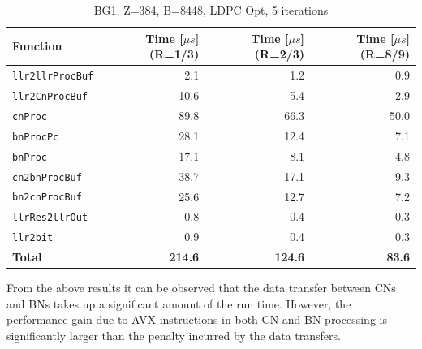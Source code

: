 \documentclass{article}
\begin{document}
\begin{table}[ht]
  \centering
  \begin{tabular}{lrrr}
    \toprule
    \textbf{Function} &  \textbf{Time [$\mu s$] (R=1/3)} & \textbf{Time [$\mu s$] (R=2/3)} & \textbf{Time [$\mu s$] (R=8/9)}\\
    \midrule
    \texttt{llr2llrProcBuf}  & 2.1  & 1.2  & 0.9  \\
    \texttt{llr2CnProcBuf}   & 10.6 & 5.4  & 2.9  \\
    \texttt{cnProc}          & 89.8 & 66.3 & 50.0 \\
    \texttt{bnProcPc}        & 28.1 & 12.4 & 7.1 \\
    \texttt{bnProc}          & 17.1 & 8.1  & 4.8 \\
    \texttt{cn2bnProcBuf}    & 38.7 & 17.1 & 9.3 \\
    \texttt{bn2cnProcBuf}    & 25.6 & 12.7 & 7.2 \\
    \texttt{llrRes2llrOut}   & 0.8  & 0.4  & 0.3 \\
    \texttt{llr2bit}         & 0.9  & 0.4  & 0.3 \\
    \midrule
    \textbf{Total}           & \textbf{214.6} & \textbf{124.6} & \textbf{83.6}\\
    \bottomrule
  \end{tabular}
  \caption{BG1, Z=384, B=8448, LDPC Opt, 5 iterations}
  \label{tab:lat-bg1-i5}
\end{table}

From the above results it can be observed that the data transfer between CNs and BNs takes up a significant amount of the run time. However, the performance gain due to AVX instructions in both CN and BN processing is significantly larger than the penalty incurred by the data transfers.
\end{document}
